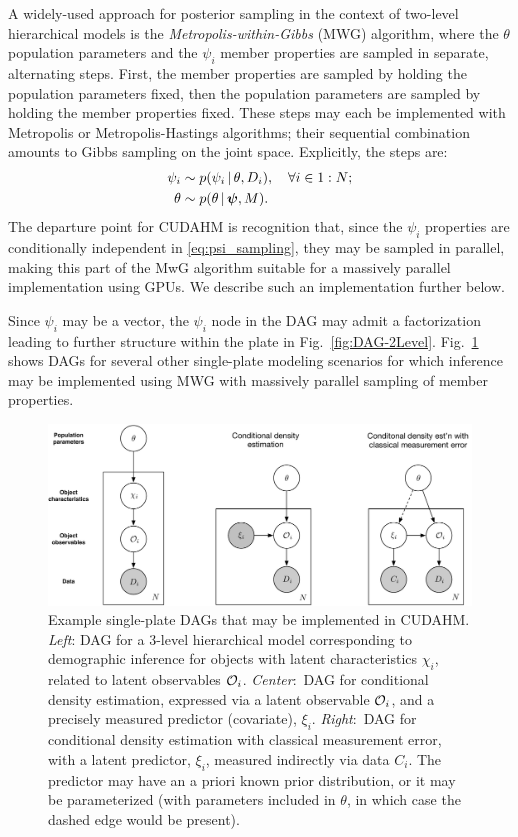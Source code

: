 A widely-used approach for posterior sampling in the context of two-level hierarchical models is the \textit{Metropolis-within-Gibbs} (MWG) algorithm, where the $\theta$ population parameters and the $\psi_i$ member properties are sampled in separate, alternating steps.
First, the member properties are sampled by holding the population parameters fixed, then the population parameters are sampled by holding the member properties fixed.
These steps may each be implemented with Metropolis or Metropolis-Hastings algorithms; their sequential combination amounts to Gibbs sampling on the joint space.
Explicitly, the steps are:
\begin{align}
\psi_i &\sim p(\psi_i \,|\, \theta, D_i), \quad\forall i\in 1:N;
\label{eq:psi_sampling} \\
\theta &\sim p(\theta \,|\, \boldsymbol{\psi}, M).
\label{eq:theta_sampling}
\end{align}
The departure point for CUDAHM is recognition that, since the $\psi_i$ properties are conditionally independent in \eqref{eq:psi_sampling}, they may be sampled in parallel, making this part of the MwG algorithm suitable for a massively parallel implementation using GPUs.
We describe such an implementation further below.

Since $\psi_i$ may be a vector, the $\psi_i$ node in the DAG may admit a factorization leading to further structure within the plate in Fig.~\ref{fig:DAG-2Level}.
Fig.~\ref{fig:DAGs} shows DAGs for several other single-plate modeling scenarios for which inference may be implemented using MWG with massively parallel sampling of member properties.

\begin{figure}
\begin{center}
\includegraphics[width=.9\textwidth]{fig/DAGs-3}
\end{center}
\caption{Example single-plate DAGs that may be implemented in CUDAHM.
\emph{Left}: DAG for a 3-level hierarchical model corresponding to demographic inference for objects with latent characteristics $\chi_i$, related to latent observables $\mathcal{O}_i$.
\emph{Center}:~DAG for conditional density estimation, expressed via a latent observable $\mathcal{O}_i$, and a precisely measured predictor (covariate), $\xi_i$.
\emph{Right}:~DAG for conditional density estimation with classical measurement error, with a latent predictor, $\xi_i$, measured indirectly via data $C_i$.
The predictor may have an a priori known prior distribution, or it may be parameterized (with parameters included in $\theta$, in which case the dashed edge would be present).}
\label{fig:DAGs}
\end{figure}

